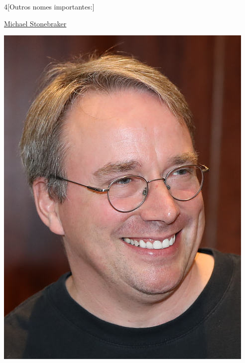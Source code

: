 \begin{multicols}{4}[Outros nomes importantes:]
\vfill\null

\columnbreak				
				
				\href{https://pt.wikipedia.org/wiki/Michael_Stonebraker}{Michael Stonebraker}
				
\begin{center}
					\includegraphics[width=.8\columnwidth]{./IMG-GIT/CIENTISTAS/linus.jpeg}
\end{center}
				
\vfill\null

\pagebreak
				
\end{multicols}
